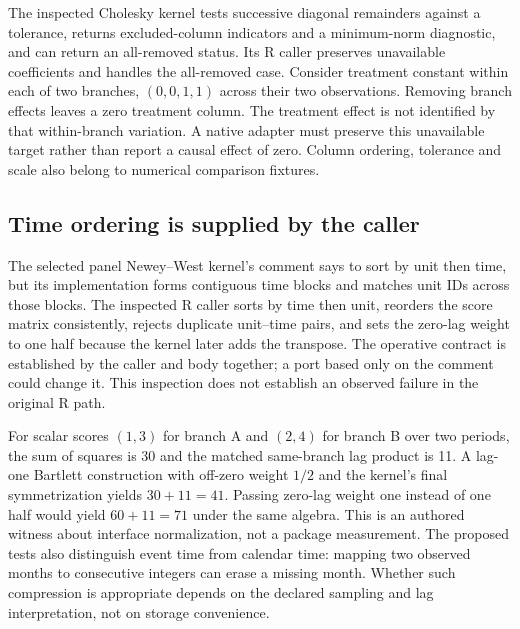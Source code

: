 The inspected Cholesky kernel tests successive diagonal remainders against
a tolerance, returns excluded-column indicators and a minimum-norm diagnostic,
and can return an all-removed status. Its R caller preserves unavailable
coefficients and handles the all-removed case. Consider treatment constant
within each of two branches, $(0,0,1,1)$ across their two observations.
Removing branch effects leaves a zero treatment column. The treatment effect
is not identified by that within-branch variation. A native adapter must
preserve this unavailable target rather than report a causal effect of zero.
Column ordering, tolerance and scale also belong to numerical comparison
fixtures.\citep{exec25_panelcxx_fixest,exec20_fixest_source,exec25_panelcxx_reference}

\subsection{Time ordering is supplied by the caller}
The selected panel Newey--West kernel's comment says to sort by unit then
time, but its implementation forms contiguous time blocks and matches unit
IDs across those blocks. The inspected R caller sorts by time then unit,
reorders the score matrix consistently, rejects duplicate unit--time pairs,
and sets the zero-lag weight to one half because the kernel later adds the
transpose. The operative contract is established by the caller and body
together; a port based only on the comment could change it. This inspection
does not establish an observed failure in the original R path.
\citep{exec25_panelcxx_fixest,exec20_fixest_source}

For scalar scores $(1,3)$ for branch A and $(2,4)$ for branch B over two
periods, the sum of squares is 30 and the matched same-branch lag product
is 11. A lag-one Bartlett construction with off-zero weight $1/2$ and the
kernel's final symmetrization yields $30+11=41$. Passing zero-lag weight
one instead of one half would yield $60+11=71$ under the same algebra.
This is an authored witness about interface normalization, not a package
measurement. The proposed tests also distinguish event time from calendar
time: mapping two observed months to consecutive integers can erase a
missing month. Whether such compression is appropriate depends on the
declared sampling and lag interpretation, not on storage convenience.
\citep{exec25_panelcxx_reference}

